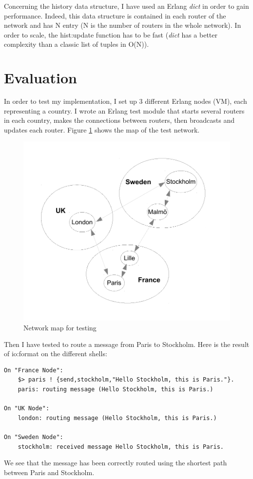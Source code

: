 \documentclass[a4paper, 11pt]{article}
\begin{document}
Concerning the history data structure, I have used an Erlang \textit{dict} in order to gain performance. Indeed, this data structure is contained in each router of the network and has N entry (N is the number of routers in the whole network). In order to scale, the hist:update function has to be fast (\textit{dict} has a better complexity than a classic list of tuples in O(N)).


\section{Evaluation}

In order to test my implementation, I set up 3 different Erlang nodes (VM), each representing a country. I wrote an Erlang test module that starts several routers in each country, makes the connections between routers, then broadcasts and updates each router. Figure \ref{fig:map} shows the map of the test network.
\begin{figure}[H]
  \begin{center}
    \includegraphics{map.pdf}
    \caption{Network map for testing}
    \label{fig:map}
  \end{center}
\end{figure}
Then I have tested to route a message from Paris to Stockholm. Here is the result of io:format on the different shells:
\begin{lstlisting}
On "France Node":
	$> paris ! {send,stockholm,"Hello Stockholm, this is Paris."}.
	paris: routing message (Hello Stockholm, this is Paris.)

On "UK Node":
	london: routing message (Hello Stockholm, this is Paris.)

On "Sweden Node":
	stockholm: received message Hello Stockholm, this is Paris.
\end{lstlisting}
We see that the message has been correctly routed using the shortest path between Paris and Stockholm.
\end{document}
